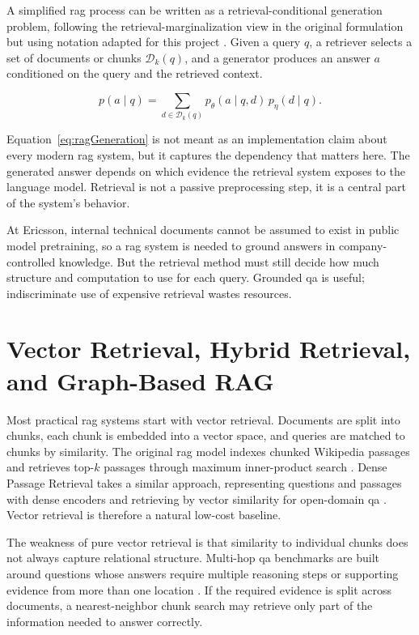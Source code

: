 \documentclass[english, bibtex]{kththesis}               %
\numberwithin{listing}{chapter}
\begin{document}
A simplified \gls{rag} process can be written as a retrieval-conditional generation problem, following the retrieval-marginalization view in the original formulation but using notation adapted for this project \cite{lewis2020rag}. Given a query \(q\), a retriever selects a set of documents or chunks \(\mathcal{D}_k(q)\), and a generator produces an answer \(a\) conditioned on the query and the retrieved context.

\begin{equation}
\label{eq:ragGeneration}
p(a \mid q) =
\sum_{d \in \mathcal{D}_k(q)}
p_\theta(a \mid q,d)\,p_\eta(d \mid q).
\end{equation}

Equation~\ref{eq:ragGeneration} is not meant as an implementation claim about every modern \gls{rag} system, but it captures the dependency that matters here. The generated answer depends on which evidence the retrieval system exposes to the language model. Retrieval is not a passive preprocessing step, it is a central part of the system's behavior.

At Ericsson, internal technical documents cannot be assumed to exist in public model pretraining, so a \gls{rag} system is needed to ground answers in company-controlled knowledge. But the retrieval method must still decide how much structure and computation to use for each query. Grounded \gls{qa} is useful; indiscriminate use of expensive retrieval wastes resources.

\section{Vector Retrieval, Hybrid Retrieval, and Graph-Based RAG}
\label{sec:backgroundHybridGraph}

Most practical \gls{rag} systems start with vector retrieval. Documents are split into chunks, each chunk is embedded into a vector space, and queries are matched to chunks by similarity. The original \gls{rag} model indexes chunked Wikipedia passages and retrieves top-\(k\) passages through maximum inner-product search \cite{lewis2020rag}. Dense Passage Retrieval takes a similar approach, representing questions and passages with dense encoders and retrieving by vector similarity for open-domain \gls{qa} \cite{karpukhin2020dpr}. Vector retrieval is therefore a natural low-cost baseline.

The weakness of pure vector retrieval is that similarity to individual chunks does not always capture relational structure. Multi-hop \gls{qa} benchmarks are built around questions whose answers require multiple reasoning steps or supporting evidence from more than one location \cite{yang2018hotpotqa,ho2020twowiki,trivedi2022musique}. If the required evidence is split across documents, a nearest-neighbor chunk search may retrieve only part of the information needed to answer correctly.
\end{document}
